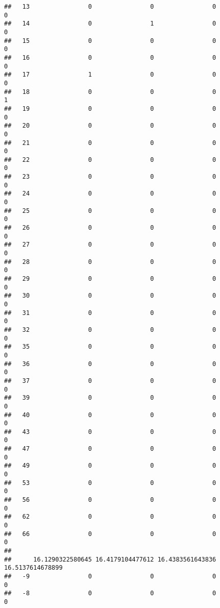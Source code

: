 \documentclass[]{article}
\begin{document}
\begin{verbatim}
##   13                0                0                0                0
##   14                0                1                0                0
##   15                0                0                0                0
##   16                0                0                0                0
##   17                1                0                0                0
##   18                0                0                0                1
##   19                0                0                0                0
##   20                0                0                0                0
##   21                0                0                0                0
##   22                0                0                0                0
##   23                0                0                0                0
##   24                0                0                0                0
##   25                0                0                0                0
##   26                0                0                0                0
##   27                0                0                0                0
##   28                0                0                0                0
##   29                0                0                0                0
##   30                0                0                0                0
##   31                0                0                0                0
##   32                0                0                0                0
##   35                0                0                0                0
##   36                0                0                0                0
##   37                0                0                0                0
##   39                0                0                0                0
##   40                0                0                0                0
##   43                0                0                0                0
##   47                0                0                0                0
##   49                0                0                0                0
##   53                0                0                0                0
##   56                0                0                0                0
##   62                0                0                0                0
##   66                0                0                0                0
##     
##      16.1290322580645 16.4179104477612 16.4383561643836 16.5137614678899
##   -9                0                0                0                0
##   -8                0                0                0                0

\end{verbatim}
\end{document}
